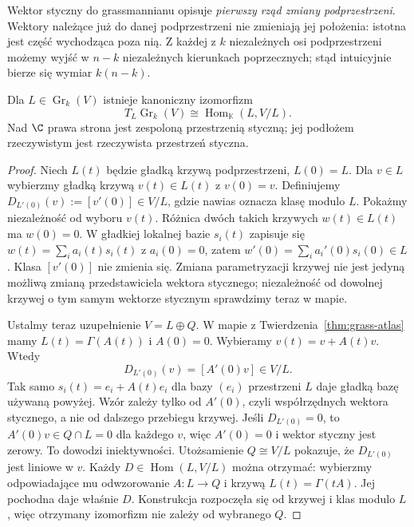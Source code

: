 Wektor styczny do grassmannianu opisuje \emph{pierwszy
rząd zmiany podprzestrzeni}. Wektory należące już do
danej podprzestrzeni nie zmieniają jej położenia:
istotna jest część wychodząca poza nią.
Z każdej z $k$ niezależnych osi podprzestrzeni możemy
wyjść w $n-k$ niezależnych kierunkach poprzecznych;
stąd intuicyjnie bierze się wymiar $k(n-k)$.

\begin{twierdzenie}
\label{thm:grass-styczna}
Dla $L\in\operatorname{Gr}_k(V)$ istnieje kanoniczny
izomorfizm
\begin{equation}\label{eq:grass-styczna}
 T_L\operatorname{Gr}_k(V)
  \cong\operatorname{Hom}_{\mathbb K}(L,V/L).
\end{equation}
Nad $\C$ prawa strona jest zespoloną przestrzenią
styczną; jej podłożem rzeczywistym jest rzeczywista
przestrzeń styczna.
\end{twierdzenie}
\begin{proof}
Niech $L(t)$ będzie gładką krzywą podprzestrzeni,
$L(0)=L$. Dla $v\in L$ wybierzmy gładką krzywą
$v(t)\in L(t)$ z $v(0)=v$. Definiujemy
$D_{L'(0)}(v):=[v'(0)]\in V/L$, gdzie nawias oznacza
klasę modulo $L$. Pokażmy niezależność od wyboru
$v(t)$. Różnica dwóch takich krzywych $w(t)\in L(t)$
ma $w(0)=0$. W gładkiej lokalnej bazie $s_i(t)$
zapisuje się $w(t)=\sum_i a_i(t)s_i(t)$ z
$a_i(0)=0$, zatem
$w'(0)=\sum_i a_i'(0)s_i(0)\in L$. Klasa
$[v'(0)]$ nie zmienia się. Zmiana parametryzacji
krzywej nie jest jedyną możliwą zmianą przedstawiciela wektora
stycznego; niezależność od dowolnej krzywej o tym samym wektorze
stycznym sprawdzimy teraz w mapie.

Ustalmy teraz uzupełnienie $V=L\oplus Q$.
W mapie z Twierdzenia~\ref{thm:grass-atlas} mamy
$L(t)=\Gamma(A(t))$ i $A(0)=0$.
Wybieramy $v(t)=v+A(t)v$. Wtedy
\[
 D_{L'(0)}(v)=[A'(0)v]\in V/L.
\]
Tak samo $s_i(t)=e_i+A(t)e_i$ dla bazy $(e_i)$ przestrzeni $L$
daje gładką bazę używaną powyżej. Wzór zależy tylko od $A'(0)$,
czyli współrzędnych wektora stycznego, a nie od dalszego przebiegu krzywej.
Jeśli $D_{L'(0)}=0$, to $A'(0)v\in Q\cap L=0$ dla każdego $v$,
więc $A'(0)=0$ i wektor styczny jest zerowy. To dowodzi iniektywności.
Utożsamienie $Q\cong V/L$ pokazuje, że
$D_{L'(0)}$ jest liniowe w $v$. Każdy
$D\in\operatorname{Hom}(L,V/L)$ można otrzymać:
wybierzmy odpowiadające mu odwzorowanie $A:L\to Q$
i krzywą $L(t)=\Gamma(tA)$. Jej pochodna daje
właśnie $D$. Konstrukcja rozpoczęła się od
krzywej i klas modulo $L$, więc otrzymany
izomorfizm nie zależy od wybranego $Q$.
\end{proof}

